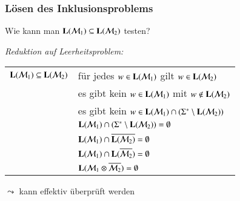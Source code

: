\documentclass[aspectratio=1610,onlymath]{beamer}
\begin{document}
\begin{frame}\frametitle{Lösen des Inklusionsproblems}

Wie kann man $\textbf{\textcolor{black}{L}}(\mathcal{M}_1)\subseteq\textbf{\textcolor{black}{L}}(\mathcal{M}_2)$ testen?\pause
\bigskip

\emph{Reduktion auf Leerheitsproblem:}\medskip

\begin{tabular}{r@{~~~ gdw ~~~}l}
$\textbf{\textcolor{black}{L}}(\mathcal{M}_1)\subseteq\textbf{\textcolor{black}{L}}(\mathcal{M}_2)$
	& für jedes $w\in \textbf{\textcolor{black}{L}}(\mathcal{M}_1)$ gilt $w\in \textbf{\textcolor{black}{L}}(\mathcal{M}_2)$\\\pause
	& es gibt kein $w\in\textbf{\textcolor{black}{L}}(\mathcal{M}_1)$ mit $w\notin\textbf{\textcolor{black}{L}}(\mathcal{M}_2)$ \\\pause
	& es gibt kein $w\in\textbf{\textcolor{black}{L}}(\mathcal{M}_1)\cap (\Sigma^*\setminus\textbf{\textcolor{black}{L}}(\mathcal{M}_2))$ \\\pause
	& $\textbf{\textcolor{black}{L}}(\mathcal{M}_1)\cap (\Sigma^*\setminus\textbf{\textcolor{black}{L}}(\mathcal{M}_2))=\emptyset$ \\\pause
	& $\textbf{\textcolor{black}{L}}(\mathcal{M}_1)\cap\overline{\textbf{\textcolor{black}{L}}(\mathcal{M}_2)}= \emptyset$ \\\pause
	& $\textbf{\textcolor{black}{L}}(\mathcal{M}_1)\cap\textbf{\textcolor{black}{L}}(\overline{\mathcal{M}_2})= \emptyset$ \\\pause
	& $\textbf{\textcolor{black}{L}}(\mathcal{M}_1\otimes\overline{\mathcal{M}_2})= \emptyset$
\end{tabular}\medskip

$\leadsto$ kann effektiv überprüft werden

\end{frame}
\end{document}
